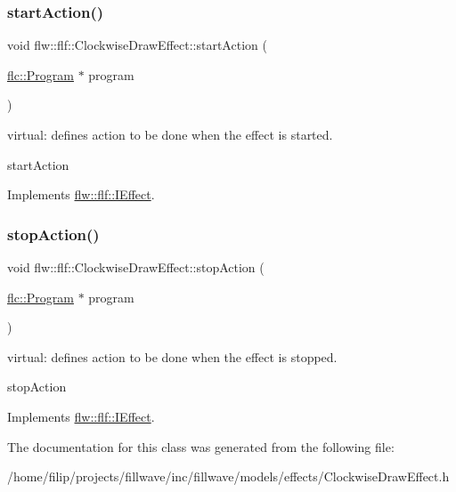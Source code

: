 \subsubsection{\texorpdfstring{start\+Action()}{startAction()}}
{\footnotesize\ttfamily void flw\+::flf\+::\+Clockwise\+Draw\+Effect\+::start\+Action (\begin{DoxyParamCaption}\item[{\hyperlink{classflw_1_1flc_1_1Program}{flc\+::\+Program} $\ast$}]{program }\end{DoxyParamCaption})\hspace{0.3cm}{\ttfamily [virtual]}}



virtual\+: defines action to be done when the effect is started. 

start\+Action 

Implements \hyperlink{classflw_1_1flf_1_1IEffect_afc7cec9080d135ed264b08a90c7b94e9}{flw\+::flf\+::\+I\+Effect}.

\mbox{\label{classflw_1_1flf_1_1ClockwiseDrawEffect_a538235e072e91bfa16e185a535547679}} 
\subsubsection{\texorpdfstring{stop\+Action()}{stopAction()}}
{\footnotesize\ttfamily void flw\+::flf\+::\+Clockwise\+Draw\+Effect\+::stop\+Action (\begin{DoxyParamCaption}\item[{\hyperlink{classflw_1_1flc_1_1Program}{flc\+::\+Program} $\ast$}]{program }\end{DoxyParamCaption})\hspace{0.3cm}{\ttfamily [virtual]}}



virtual\+: defines action to be done when the effect is stopped. 

stop\+Action 

Implements \hyperlink{classflw_1_1flf_1_1IEffect_a1a03eaf63a9d4edbd8764540d2d4133c}{flw\+::flf\+::\+I\+Effect}.



The documentation for this class was generated from the following file\+:\begin{DoxyCompactItemize}
\item 
/home/filip/projects/fillwave/inc/fillwave/models/effects/Clockwise\+Draw\+Effect.\+h\end{DoxyCompactItemize}
